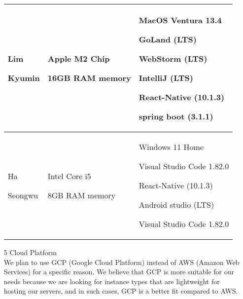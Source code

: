 \documentclass[conference]{IEEEtran}
\begin{document}
\begin{enumerate}
\begin{table}[h]
\begin{tabular}{|p{1.2cm}|p{3.0cm}|p{3.6cm}|}
         Lim \par Kyumin & Apple M2 Chip\par 16GB RAM memory & MacOS Ventura 13.4 \par GoLand (LTS) \par WebStorm (LTS)\par IntelliJ (LTS) \par React-Native (10.1.3) \par spring boot (3.1.1)\\ \hline
        
       Ha \par Seongwu & Intel Core i5 \par 8GB RAM memory & Windows 11 Home \par Visual Studio Code 1.82.0 \par React-Native (10.1.3)\par Android studio (LTS) \par Visual Studio Code 1.82.0 \\ \hline

	\end{tabular}
\end{table}

\item[5] Cloud Platform\\
We plan to use GCP (Google Cloud Platform) instead of AWS (Amazon Web Services) for a specific reason. We believe that GCP is more suitable for our needs because we are looking for instance types that are lightweight for hosting our servers, and in such cases, GCP is a better fit compared to AWS.
\end{enumerate}
\end{document}
